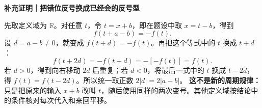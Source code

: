 \clearpage
\begin{proofbox}
\textbf{补充证明｜把错位反号换成已经会的反号型}


先取定义域为 $\mathbb R$。对任意 $t$，令 $t=x+b$，即在题设中取 $x=t-b$，得到
\[f(t+a-b)=-f(t).\]
设 $d=a-b\ne0$，就变成 $f(t+d)=-f(t)$。再把这个等式中的 $t$ 换成 $t+d$：
\[f(t+2d)=-f(t+d)=-[-f(t)]=f(t).\]
若 $d>0$，得到向右移动 $2d$ 后重复；若 $d<0$，将最后一式中的 $t$ 换成 $t-2d$，得 $f(t)=f(t-2d)$。所以统一取正数 $2|d|=2|a-b|$。
\textbf{这不是新的周期规律：}只是把原来的输入 $x+b$ 改叫 $t$，随后使用同样的两次变号。其他定义域按结论中的条件核对每次代入和来回平移。

\end{proofbox}

